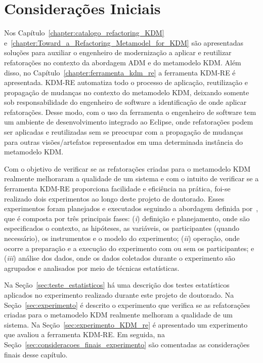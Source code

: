 \section{Considerações Iniciais}

Nos Capítulo~\ref{chapter:catalogo_refactoring_KDM} e~\ref{chapter:Toward_a_Refactoring_Metamodel_for_KDM} são apresentadas soluções para auxiliar o engenheiro de modernização a aplicar e reutilizar refatorações no contexto da abordagem ADM e do metamodelo KDM. Além disso, no Capítulo~\ref{chapter:ferramenta_kdm_re} a ferramenta KDM-RE é apresentada. KDM-RE automatiza todo o processo de aplicação, reutilização e propagação de mudanças no contexto do metamodelo KDM, deixando somente sob responsabilidade do engenheiro de software a identificação de onde aplicar refatorações. Desse modo, com o uso da ferramenta o engenheiro de software tem um ambiente de desenvolvimento integrado ao Eclipse, onde refatorações podem ser aplicadas e reutilizadas sem se preocupar com a propagação de mudanças para outras visões/artefatos representados em uma determinada instância do metamodelo KDM.

Com o objetivo de verificar se as refatorações criadas para o metamodelo KDM realmente melhoraram a qualidade de um sistema e com o intuito de verificar se a ferramenta KDM-RE proporciona facilidade e eficiência na prática, foi-se realizado dois experimentos ao longo deste projeto de doutorado. Esses experimentos foram planejados e executados seguindo a abordagem definida por~, que é composta por três principais fases: (\textit{i}) definição e planejamento, onde são especificados o contexto, as hipóteses, as variáveis, os participantes (quando necessário), os instrumentos e o modelo do experimento; (\textit{ii}) operação, onde ocorre a preparação e a execução do experimento com ou sem os participantes; e (\textit{iii}) análise dos dados, onde os dados coletados durante o experimento são agrupados e analisados por meio de técnicas estatísticas.

Na Seção~\ref{sec:teste_estatisticos} há uma descrição dos testes estatísticos aplicados no experimento realizado durante este projeto de doutorado. Na Seção~\ref{sec:experimento} é descrito o experimento que verifica se as refatorações criadas para o metamodelo KDM realmente melhoram a qualidade de um sistema. Na Seção~\ref{sec:experimento_KDM_re} é apresentado um experimento que avaliou a ferramenta KDM-RE. Em seguida, na Seção~\ref{sec:consideracoes_finais_experimento} são comentadas as considerações finais desse capítulo.

